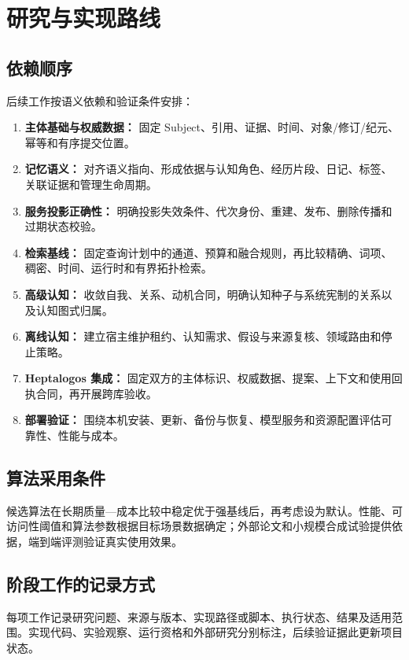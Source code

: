\chapter{研究与实现路线}

\section{依赖顺序}

后续工作按语义依赖和验证条件安排：

\begin{enumerate}
\item \textbf{主体基础与权威数据：} 固定 Subject、引用、证据、时间、对象/修订/纪元、幂等和有序提交位置。
\item \textbf{记忆语义：} 对齐语义指向、形成依据与认知角色、经历片段、日记、标签、关联证据和管理生命周期。
\item \textbf{服务投影正确性：} 明确投影失效条件、代次身份、重建、发布、删除传播和过期状态校验。
\item \textbf{检索基线：} 固定查询计划中的通道、预算和融合规则，再比较精确、词项、稠密、时间、运行时和有界拓扑检索。
\item \textbf{高级认知：} 收敛自我、关系、动机合同，明确认知种子与系统宪制的关系以及认知图式归属。
\item \textbf{离线认知：} 建立宿主维护租约、认知需求、假设与来源复核、领域路由和停止策略。
\item \textbf{Heptalogos 集成：} 固定双方的主体标识、权威数据、提案、上下文和使用回执合同，再开展跨库验收。
\item \textbf{部署验证：} 围绕本机安装、更新、备份与恢复、模型服务和资源配置评估可靠性、性能与成本。
\end{enumerate}

\section{算法采用条件}

候选算法在长期质量—成本比较中稳定优于强基线后，再考虑设为默认。性能、可访问性阈值和算法参数根据目标场景数据确定；外部论文和小规模合成试验提供依据，端到端评测验证真实使用效果。\cite{nous-research-package}

\section{阶段工作的记录方式}

每项工作记录研究问题、来源与版本、实现路径或脚本、执行状态、结果及适用范围。实现代码、实验观察、运行资格和外部研究分别标注，后续验证据此更新项目状态。
